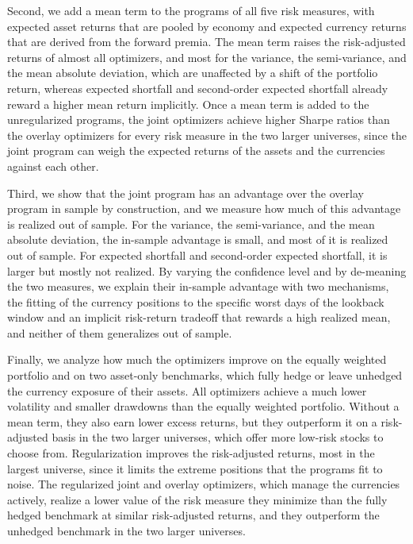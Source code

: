 Second, we add a mean term to the programs of all five risk measures, with expected asset returns that are pooled by
economy and expected currency returns that are derived from the forward premia. The mean term raises the
risk-adjusted returns of almost all optimizers, and most for the variance, the semi-variance, and the mean absolute
deviation, which are unaffected by a shift of the portfolio return, whereas expected shortfall and second-order 
expected shortfall already reward a higher mean return implicitly. Once a mean term is added to the unregularized programs, the joint optimizers
achieve higher Sharpe ratios than the overlay optimizers for every risk measure in the two larger universes, since the
joint program can weigh the expected returns of the assets and the currencies against each other.

Third, we show that the joint program has an advantage over the overlay program in sample by construction, and we
measure how much of this advantage is realized out of sample. For the variance, the semi-variance, and the mean
absolute deviation, the in-sample advantage is small, and most of it is realized out of sample. For expected shortfall
and second-order expected shortfall, it is larger but mostly not realized. By varying the confidence level and by
de-meaning the two measures, we explain their in-sample advantage with two mechanisms, the fitting of the currency positions
to the specific worst days of the lookback window and an implicit risk-return tradeoff that rewards a high realized
mean, and neither of them generalizes out of sample.

Finally, we analyze how much the optimizers improve on the equally weighted portfolio and on two asset-only benchmarks,
which fully hedge or leave unhedged the currency exposure of their assets. All optimizers achieve a much lower
volatility and smaller drawdowns than the equally weighted portfolio. Without a mean term, they also earn lower excess
returns, but they outperform it on a risk-adjusted basis in the two larger universes, which offer more low-risk stocks
to choose from. Regularization improves the risk-adjusted returns,
most in the largest universe, since it limits the extreme positions that the programs fit to noise. The regularized
joint and overlay optimizers, which manage the currencies actively, realize a lower value of the risk measure they
minimize than the fully hedged benchmark at similar risk-adjusted returns, and they outperform the unhedged benchmark in
the two larger universes. 

